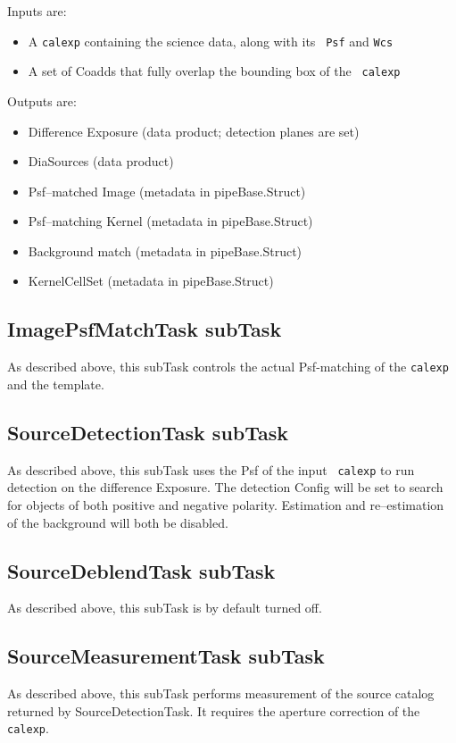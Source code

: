 \documentclass[12pt]{article}
\begin{document}
Inputs are:
\begin{itemize}
\item A {\tt calexp} containing the science data, along with its {\tt
  Psf} and {\tt Wcs}
\item A set of Coadds that fully overlap the bounding box of the {\tt
  calexp}
\end{itemize}

Outputs are:
\begin{itemize}
\item Difference Exposure (data product; detection planes are set)
\item DiaSources (data product)
\item Psf--matched Image (metadata in pipeBase.Struct)
\item Psf--matching Kernel (metadata in pipeBase.Struct)
\item Background match (metadata in pipeBase.Struct)
\item KernelCellSet (metadata in pipeBase.Struct)
\end{itemize}

\subsection{ImagePsfMatchTask subTask}
As described above, this subTask controls the actual Psf-matching of
the {\tt calexp} and the template.  

\subsection{SourceDetectionTask subTask}
As described above, this subTask uses the Psf of the input {\tt
  calexp} to run detection on the difference Exposure.  The detection
Config will be set to search for objects of both positive and negative
polarity.  Estimation and re--estimation of the background will both
be disabled.

\subsection{SourceDeblendTask subTask}
As described above, this subTask is by default turned off.

\subsection{SourceMeasurementTask subTask}
As described above, this subTask performs measurement of the source
catalog returned by SourceDetectionTask.  It requires the aperture
correction of the {\tt calexp}.
\end{document}
